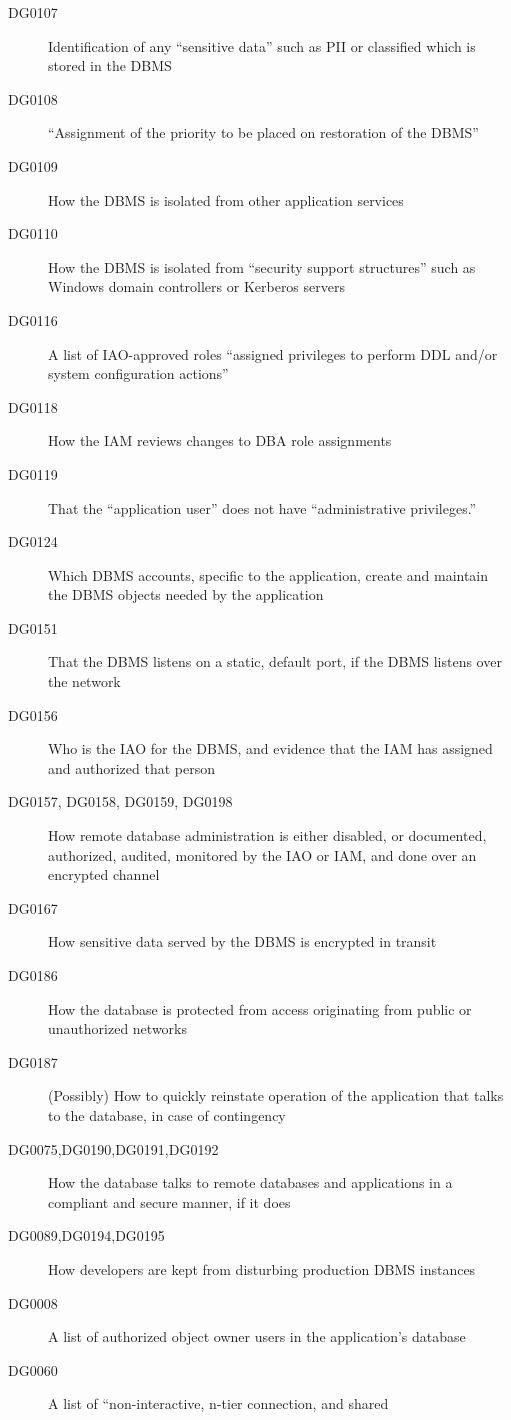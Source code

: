 \begin{description}
\item[DG0107] Identification of any ``sensitive data'' such as PII or
classified which is stored in the DBMS
\item[DG0108] ``Assignment of the priority to be placed on restoration of
the DBMS''
\item[DG0109] How the DBMS is isolated from other application services
\item[DG0110] How the DBMS is isolated from ``security support
structures'' such as Windows domain controllers or Kerberos servers
\item[DG0116] A list of IAO-approved roles ``assigned privileges to
perform DDL and/or system configuration actions''
\item[DG0118] How the IAM reviews changes to DBA role assignments
\item[DG0119] That the ``application user'' does not have ``administrative
privileges.''
\item[DG0124] Which DBMS accounts, specific to the application, create and
maintain the DBMS objects needed by the application
\item[DG0151] That the DBMS listens on a static, default port, if the DBMS
listens over the network
\item[DG0156] Who is the IAO for the DBMS, and evidence that the IAM has
assigned and authorized that person
\item[DG0157, DG0158, DG0159, DG0198] How remote database administration
is either disabled, or documented, authorized, audited, monitored by the
IAO or IAM, and done over an encrypted channel
\item[DG0167] How sensitive data served by the DBMS is encrypted in
transit
\item[DG0186] How the database is protected from access originating from
public or unauthorized networks
\item[DG0187] (Possibly) How to quickly reinstate operation of the
application that talks to the database, in case of contingency
\item[DG0075,DG0190,DG0191,DG0192] How the database talks to remote
databases and applications in a compliant and secure manner, if it does
\item[DG0089,DG0194,DG0195] How developers are kept from disturbing
production DBMS instances
\item[DG0008] A list of authorized object owner users in the application's
database
\item[DG0060] A list of ``non-interactive, n-tier connection, and shared

\end{description}
